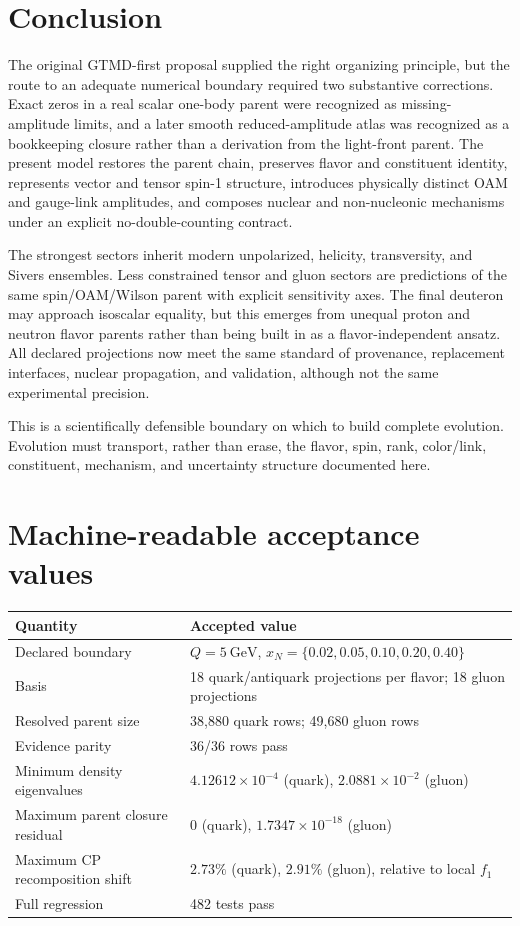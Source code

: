 \documentclass[11pt]{article}
\begin{document}
\section{Conclusion}

The original GTMD-first proposal supplied the right organizing principle,
but the route to an adequate numerical boundary required two substantive
corrections.  Exact zeros in a real scalar one-body parent were recognized
as missing-amplitude limits, and a later smooth reduced-amplitude atlas was
recognized as a bookkeeping closure rather than a derivation from the
light-front parent.  The present model restores the parent chain, preserves
flavor and constituent identity, represents vector and tensor spin-1
structure, introduces physically distinct OAM and gauge-link amplitudes,
and composes nuclear and non-nucleonic mechanisms under an explicit
no-double-counting contract.

The strongest sectors inherit modern unpolarized, helicity, transversity,
and Sivers ensembles.  Less constrained tensor and gluon sectors are
predictions of the same spin/OAM/Wilson parent with explicit sensitivity
axes.  The final deuteron may approach isoscalar equality, but this emerges
from unequal proton and neutron flavor parents rather than being built in
as a flavor-independent ansatz.  All declared projections now meet the
same standard of provenance, replacement interfaces, nuclear propagation,
and validation, although not the same experimental precision.

This is a scientifically defensible boundary on which to build complete
evolution.  Evolution must transport, rather than erase, the flavor, spin,
rank, color/link, constituent, mechanism, and uncertainty structure
documented here.

\appendix
\section{Machine-readable acceptance values}

\begin{tabularx}{\textwidth}{L{0.48\textwidth}Y}
\toprule
Quantity & Accepted value \\
\midrule
Declared boundary &
\(Q=5~\mathrm{GeV}\),
\(x_N=\{0.02,0.05,0.10,0.20,0.40\}\) \\
Basis & 18 quark/antiquark projections per flavor; 18 gluon projections \\
Resolved parent size & 38,880 quark rows; 49,680 gluon rows \\
Evidence parity & 36/36 rows pass \\
Minimum density eigenvalues &
\(4.12612\times10^{-4}\) (quark),
\(2.0881\times10^{-2}\) (gluon) \\
Maximum parent closure residual &
\(0\) (quark), \(1.7347\times10^{-18}\) (gluon) \\
Maximum CP recomposition shift &
\(2.73\%\) (quark), \(2.91\%\) (gluon), relative to local \(f_1\) \\
Full regression & 482 tests pass \\
\bottomrule
\end{tabularx}
\end{document}
